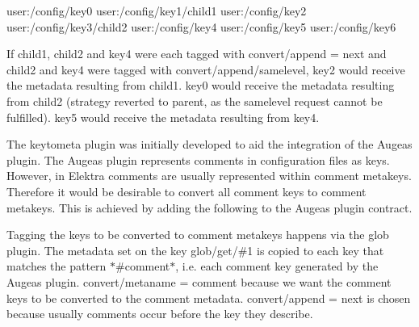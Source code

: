 \begin{DoxyCode}
user:/config/key0
user:/config/key1/child1
user:/config/key2
user:/config/key3/child2
user:/config/key4
user:/config/key5
user:/config/key6
\end{DoxyCode}


If child1, child2 and key4 were each tagged with {\ttfamily convert/append = next} and child2 and key4 were tagged with {\ttfamily convert/append/samelevel}, key2 would receive the metadata resulting from child1. key0 would receive the metadata resulting from child2 (strategy reverted to parent, as the samelevel request cannot be fulfilled). key5 would receive the metadata resulting from key4.

The keytometa plugin was initially developed to aid the integration of the Augeas plugin. The Augeas plugin represents comments in configuration files as keys. However, in Elektra comments are usually represented within comment metakeys. Therefore it would be desirable to convert all comment keys to comment metakeys. This is achieved by adding the following to the Augeas plugin contract.




Tagging the keys to be converted to comment metakeys happens via the glob plugin. The metadata set on the key {\ttfamily glob/get/\#1} is copied to each key that matches the pattern {\ttfamily $\ast$\#comment$\ast$}, i.\+e. each comment key generated by the Augeas plugin. {\ttfamily convert/metaname = comment} because we want the comment keys to be converted to the comment metadata. {\ttfamily convert/append = next} is chosen because usually comments occur before the key they describe. 